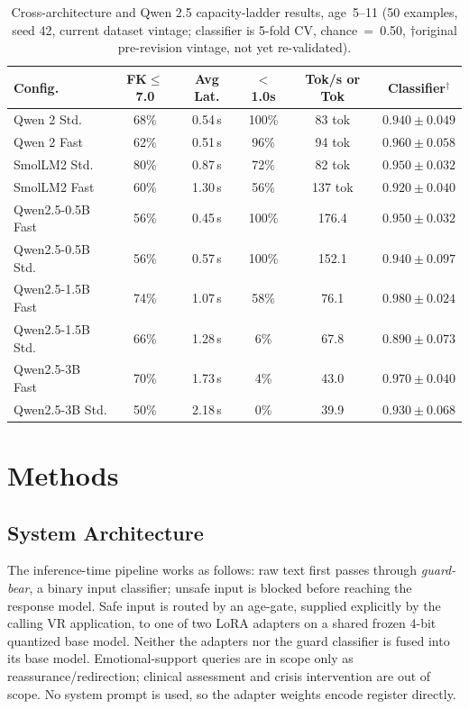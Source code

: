 \documentclass[pdflatex,sn-mathphys-num]{sn-jnl}%
\begin{document}
\begin{table}[!h]
  \centering
  \caption{Cross-architecture and Qwen 2.5 capacity-ladder results, age~5--11 (50 examples, seed 42, current dataset vintage; classifier is 5-fold CV, chance~=~0.50, $\dagger$original pre-revision vintage, not yet re-validated).}
  \label{tab:crossarch}
  \scriptsize
  \setlength{\tabcolsep}{3pt}
  \begin{tabular}{@{}lccccc@{}}
    \toprule
    Config. & FK$\leq$7.0 & Avg Lat. & $<$1.0s & Tok/s or Tok & Classifier$^\dagger$ \\
    \midrule
    Qwen 2 Std.       & 68\% & 0.54\,s & 100\% & 83 tok  & $0.940 \pm 0.049$ \\
    Qwen 2 Fast       & 62\% & 0.51\,s & 96\%  & 94 tok  & $0.960 \pm 0.058$ \\
    SmolLM2 Std.      & 80\% & 0.87\,s & 72\%  & 82 tok  & $0.950 \pm 0.032$ \\
    SmolLM2 Fast      & 60\% & 1.30\,s & 56\%  & 137 tok & $0.920 \pm 0.040$ \\
    Qwen2.5-0.5B Fast & 56\% & 0.45\,s & 100\% & 176.4   & $0.950 \pm 0.032$ \\
    Qwen2.5-0.5B Std. & 56\% & 0.57\,s & 100\% & 152.1   & $0.940 \pm 0.097$ \\
    Qwen2.5-1.5B Fast & 74\% & 1.07\,s & 58\%  & 76.1    & $\mathbf{0.980 \pm 0.024}$ \\
    Qwen2.5-1.5B Std. & 66\% & 1.28\,s & 6\%   & 67.8    & $0.890 \pm 0.073$ \\
    Qwen2.5-3B Fast   & 70\% & 1.73\,s & 4\%   & 43.0    & $0.970 \pm 0.040$ \\
    Qwen2.5-3B Std.   & 50\% & 2.18\,s & 0\%   & 39.9    & $0.930 \pm 0.068$ \\
    \bottomrule
  \end{tabular}
\end{table}

\section{Methods}\label{sec:methodology}

\subsection{System Architecture}\label{sec:architecture}

The inference-time pipeline works as follows: raw text first passes through \textit{guard-bear}, a binary input classifier; unsafe input is blocked before reaching the response model. Safe input is routed by an age-gate, supplied explicitly by the calling VR application, to one of two LoRA adapters on a shared frozen 4-bit quantized base model. Neither the adapters nor the guard classifier is fused into its base model. Emotional-support queries are in scope only as reassurance/redirection; clinical assessment and crisis intervention are out of scope. No system prompt is used, so the adapter weights encode register directly.
\end{document}
